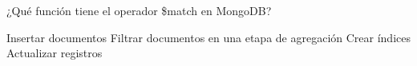 \question[1] ¿Qué función tiene el operador \$match en MongoDB?
\begin{choices}
\choice Insertar documentos
\CorrectChoice Filtrar documentos en una etapa de agregación
\choice Crear índices
\choice Actualizar registros
\end{choices}